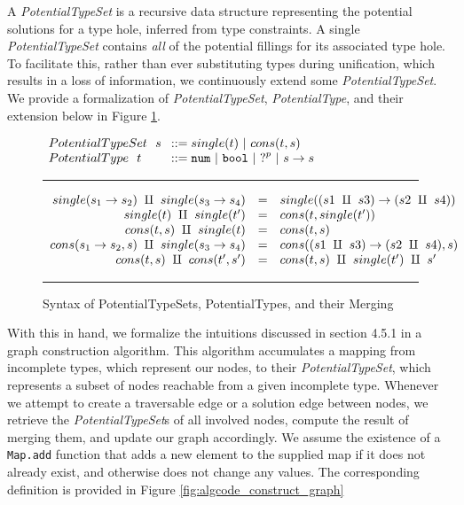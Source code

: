 A \textit{PotentialTypeSet} is a recursive data structure representing the potential solutions for a type hole, inferred from type constraints. A single \emph{PotentialTypeSet} contains \emph{all} of the potential fillings for its associated type hole. To facilitate this, rather than ever substituting types during unification, which results in a loss of information, we continuously extend some \emph{PotentialTypeSet}. We provide a formalization of \textit{PotentialTypeSet}, \textit{PotentialType}, and their extension below in Figure \ref{fig:possible_type_sets}.

\begin{figure}[hbp!]
\centering
\vspace{-3px} 
$\arraycolsep=4pt\begin{array}{lll}
PotentialTypeSet~~ s & ::= 
single(t) ~\vert~ 
cons(t, s)
\\
PotentialType~~ t & ::= 
  \tnum ~\vert~
  \tbool ~\vert~
  \tehole^p ~\vert~
  \tarr{s}{s}
  \\
\end{array}$
\label{fig:syntax_possible_type_sets}
\vspace{5px}
\hrule
\[\begin{array}{rcl}
    single(s_1 \rightarrow s_2) ~\amalg~ single(s_3 \rightarrow s_4) & = & single({(s1 ~\amalg~ s3) \rightarrow (s2 ~\amalg~ s4)}) \\
    single(t) ~\amalg~ single(t') & = & cons(t, single(t')) \\
    cons(t,s) ~\amalg~ single(t) & = & cons(t, s) \\
    cons(s_1 \rightarrow s_2, s) ~\amalg~ single(s_3 \rightarrow s_4) & = & cons((s1 ~\amalg~ s3) \rightarrow (s2 ~\amalg~ s4) , s) \\
    cons(t,s) ~\amalg~ cons(t',s') & = & cons(t,s) ~\amalg~ single(t') ~\amalg~ s' \\
\end{array}\] 
\caption{Syntax of PotentialTypeSets, PotentialTypes, and their Merging}
\vspace{5px} 
\hrule
\label{fig:possible_type_sets}
\vspace{-5px}
\end{figure}

With this in hand, we formalize the intuitions discussed in section 4.5.1 in a graph construction algorithm. This algorithm accumulates a mapping from incomplete types, which represent our nodes, to their \emph{PotentialTypeSet}, which represents a subset of nodes reachable from a given incomplete type. Whenever we attempt to create a traversable edge or a solution edge between nodes, we retrieve the \emph{PotentialTypeSet}s of all involved nodes, compute the result of merging them, and update our graph accordingly. We assume the existence of a \lstinline{Map.add} function that adds a new element to the supplied map if it does not already exist, and otherwise does not change any values. The corresponding definition is provided in Figure \ref{fig:algcode_construct_graph}

